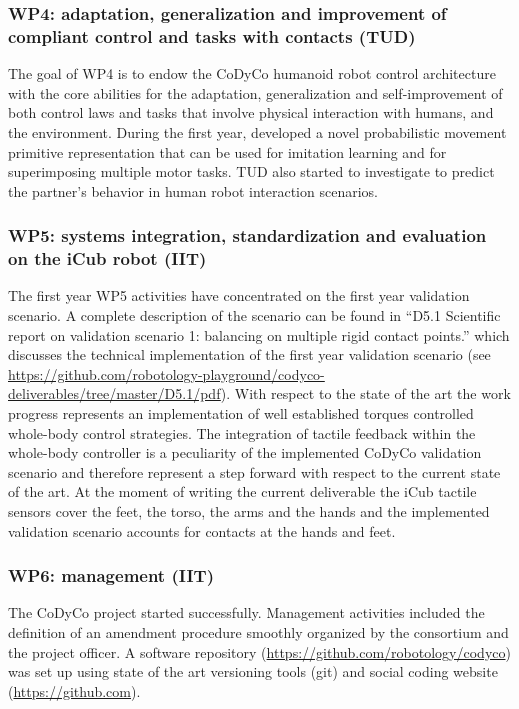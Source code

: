 \documentclass[12pt,a4paper,twoside]{article}
\begin{document}
\subsubsection{WP4: adaptation, generalization and improvement of compliant control and tasks with contacts (TUD)}

The goal of WP4 is to endow the CoDyCo
humanoid robot control architecture with the
core abilities for the adaptation, generalization
and self-improvement of both control laws and
tasks that involve physical interaction with
humans, and the environment.
During the first year, developed a novel 
probabilistic movement primitive representation that
can be used for imitation learning and for superimposing multiple motor tasks. 
TUD also started to investigate to predict the partner's behavior in 
human robot interaction scenarios. 

\subsubsection{WP5: systems integration, standardization and evaluation on the iCub robot (IIT)}

The first year WP5 activities have concentrated on the first year validation scenario. A complete description of the scenario can be found in ``D5.1 Scientific report on validation scenario 1: balancing on multiple rigid contact points.'' which discusses the technical implementation of the first year validation scenario (see \url{https://github.com/robotology-playground/codyco-deliverables/tree/master/D5.1/pdf}). With respect to the state of the art the work progress represents an implementation of well established torques controlled whole-body control strategies. The integration of tactile feedback within the whole-body controller is a peculiarity of the implemented CoDyCo validation scenario and therefore represent a step forward with respect to the current state of the art. At the moment of writing the current deliverable the iCub tactile sensors cover the feet, the torso, the arms and the hands and the implemented validation scenario accounts for contacts at the hands and feet.

\subsubsection{WP6: management (IIT)}

The CoDyCo project started successfully. Management activities included the definition of an amendment procedure smoothly organized by the consortium and the project officer. A software repository (\url{https://github.com/robotology/codyco}) was set up using state of the art versioning tools (git) and social coding website (\url{https://github.com}). 
\end{document}
